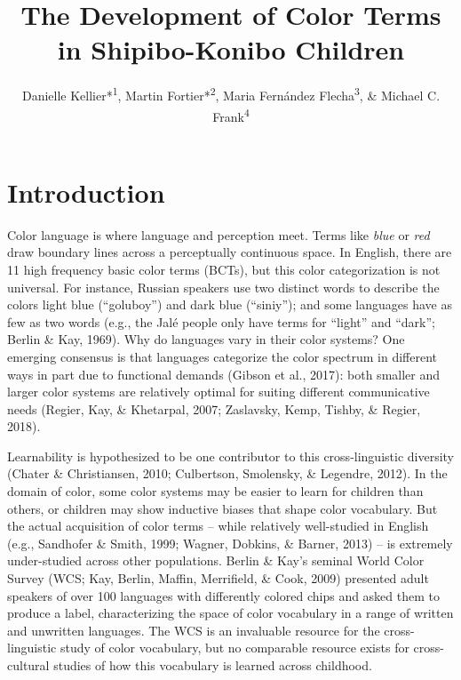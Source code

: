 \documentclass[
  english,
  ,man,floatsintext]{apa6}
\title{The Development of Color Terms in Shipibo-Konibo Children}
\author{Danielle Kellier*\textsuperscript{1}, Martin Fortier*\textsuperscript{2}, Maria Fernández Flecha\textsuperscript{3}, \& Michael C. Frank\textsuperscript{4}}
\date{}
\affiliation{\vspace{0.5cm}\textsuperscript{1} University of Pennsylvania\\\textsuperscript{2} PSL Research University\\\textsuperscript{3} Pontificia Universidad Católica del Perú\\\textsuperscript{4} Stanford University}
\begin{document}
\maketitle

\hypertarget{introduction}{%
\section{Introduction}\label{introduction}}

Color language is where language and perception meet. Terms like \emph{blue} or \emph{red} draw boundary lines across a perceptually continuous space. In English, there are 11 high frequency basic color terms (BCTs), but this color categorization is not universal. For instance, Russian speakers use two distinct words to describe the colors light blue (\enquote{goluboy}) and dark blue (\enquote{siniy}); and some languages have as few as two words (e.g., the Jalé people only have terms for ``light'' and ``dark''; Berlin \& Kay, 1969). Why do languages vary in their color systems? One emerging consensus is that languages categorize the color spectrum in different ways in part due to functional demands (Gibson et al., 2017): both smaller and larger color systems are relatively optimal for suiting different communicative needs (Regier, Kay, \& Khetarpal, 2007; Zaslavsky, Kemp, Tishby, \& Regier, 2018).

Learnability is hypothesized to be one contributor to this cross-linguistic diversity (Chater \& Christiansen, 2010; Culbertson, Smolensky, \& Legendre, 2012). In the domain of color, some color systems may be easier to learn for children than others, or children may show inductive biases that shape color vocabulary. But the actual acquisition of color terms -- while relatively well-studied in English (e.g., Sandhofer \& Smith, 1999; Wagner, Dobkins, \& Barner, 2013) -- is extremely under-studied across other populations. Berlin \& Kay's seminal World Color Survey (WCS; Kay, Berlin, Maffin, Merrifield, \& Cook, 2009) presented adult speakers of over 100 languages with differently colored chips and asked them to produce a label, characterizing the space of color vocabulary in a range of written and unwritten languages. The WCS is an invaluable resource for the cross-linguistic study of color vocabulary, but no comparable resource exists for cross-cultural studies of how this vocabulary is learned across childhood.
\end{document}
